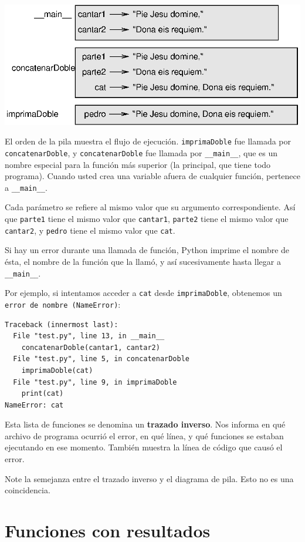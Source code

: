  \beforefig \centerline{\includegraphics{illustrations/stack}}
\afterfig

El orden de la pila muestra el flujo de ejecución. \texttt{imprimaDoble}
fue llamada por \texttt{concatenarDoble}, y \texttt{concatenarDoble}
fue llamada por \texttt{\_\_main\_\_}, que es un nombre especial para
la función más superior (la principal, que tiene todo programa). Cuando
usted crea una variable afuera de cualquier función, pertenece a \texttt{\_\_main\_\_}.

Cada parámetro se refiere al mismo valor que su argumento correspondiente.
Así que \texttt{parte1} tiene el mismo valor que \texttt{cantar1},
\texttt{parte2} tiene el mismo valor que \texttt{cantar2}, y \texttt{pedro}
tiene el mismo valor que \texttt{cat}.

Si hay un error durante una llamada de función, Python imprime el
nombre de ésta, el nombre de la función que la llamó, y así sucesivamente
hasta llegar a \texttt{\_\_main\_\_}.

Por ejemplo, si intentamos acceder a \texttt{cat} desde \texttt{imprimaDoble},
obtenemos un \texttt{error de nombre (NameError)}:
\begin{verbatim}
Traceback (innermost last):
  File "test.py", line 13, in __main__
    concatenarDoble(cantar1, cantar2)
  File "test.py", line 5, in concatenarDoble
    imprimaDoble(cat)
  File "test.py", line 9, in imprimaDoble
    print(cat)
NameError: cat
\end{verbatim}
Esta lista de funciones se denomina un \textbf{trazado inverso}. Nos
informa en qué archivo de programa ocurrió el error, en qué línea,
y qué funciones se estaban ejecutando en ese momento. También muestra
la línea de código que causó el error.


Note la semejanza entre el trazado inverso y el diagrama de pila.
Esto no es una coincidencia.

\section{Funciones con resultados}

